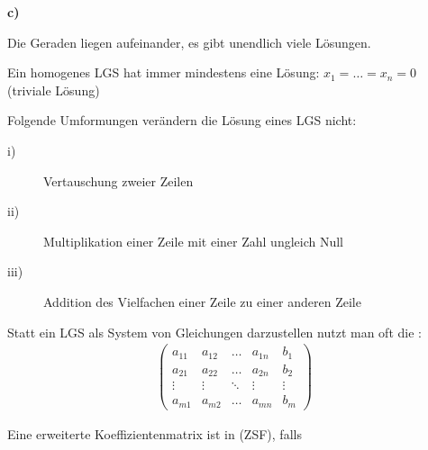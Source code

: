 \begin{samepage}
\textbf{c)}
\begin{center}
\end{center}
Die Geraden liegen aufeinander, es gibt unendlich viele Lösungen.
\end{samepage}

Ein homogenes LGS hat immer mindestens eine Lösung: $x_1 = \dots = x_n = 0$ (triviale Lösung)

Folgende Umformungen verändern die Lösung eines LGS nicht:

\begin{description}
\item[i)]{Vertauschung zweier Zeilen}
\item[ii)]{Multiplikation einer Zeile mit einer Zahl ungleich Null}
\item[iii)]{Addition des Vielfachen einer Zeile zu einer anderen Zeile}
\end{description}

Statt ein LGS als System von Gleichungen darzustellen nutzt man oft die :
\begin{align*}
    \left(\begin{array}{cccc|c}
        a_{11} & a_{12} & \dots & a_{1n} & b_1 \\
        a_{21} & a_{22} & \dots & a_{2n} & b_2 \\
        \vdots & \vdots & \ddots & \vdots & \vdots \\
        a_{m1} & a_{m2} & \dots & a_{mn} & b_m
    \end{array}\right)
\end{align*}

Eine erweiterte Koeffizientenmatrix ist in  (ZSF), falls

